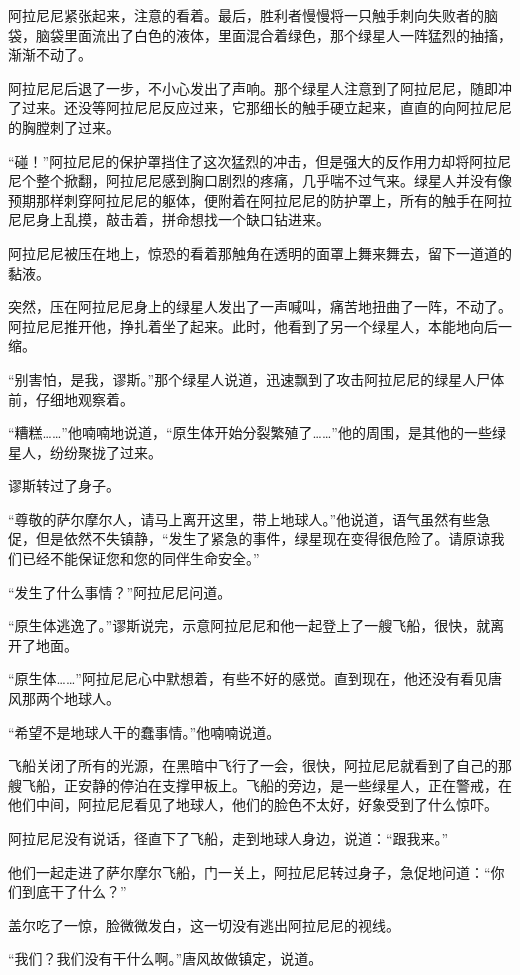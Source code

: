 阿拉尼尼紧张起来，注意的看着。最后，胜利者慢慢将一只触手刺向失败者的脑袋，脑袋里面流出了白色的液体，里面混合着绿色，那个绿星人一阵猛烈的抽搐，渐渐不动了。

阿拉尼尼后退了一步，不小心发出了声响。那个绿星人注意到了阿拉尼尼，随即冲了过来。还没等阿拉尼尼反应过来，它那细长的触手硬立起来，直直的向阿拉尼尼的胸膛刺了过来。

“碰！”阿拉尼尼的保护罩挡住了这次猛烈的冲击，但是强大的反作用力却将阿拉尼尼个整个掀翻，阿拉尼尼感到胸口剧烈的疼痛，几乎喘不过气来。绿星人并没有像预期那样刺穿阿拉尼尼的躯体，便附着在阿拉尼尼的防护罩上，所有的触手在阿拉尼尼身上乱摸，敲击着，拼命想找一个缺口钻进来。

阿拉尼尼被压在地上，惊恐的看着那触角在透明的面罩上舞来舞去，留下一道道的黏液。

突然，压在阿拉尼尼身上的绿星人发出了一声喊叫，痛苦地扭曲了一阵，不动了。阿拉尼尼推开他，挣扎着坐了起来。此时，他看到了另一个绿星人，本能地向后一缩。

“别害怕，是我，谬斯。”那个绿星人说道，迅速飘到了攻击阿拉尼尼的绿星人尸体前，仔细地观察着。

“糟糕……”他喃喃地说道，“原生体开始分裂繁殖了……”他的周围，是其他的一些绿星人，纷纷聚拢了过来。

谬斯转过了身子。

“尊敬的萨尔摩尔人，请马上离开这里，带上地球人。”他说道，语气虽然有些急促，但是依然不失镇静，“发生了紧急的事件，绿星现在变得很危险了。请原谅我们已经不能保证您和您的同伴生命安全。”

“发生了什么事情？”阿拉尼尼问道。

“原生体逃逸了。”谬斯说完，示意阿拉尼尼和他一起登上了一艘飞船，很快，就离开了地面。

“原生体……”阿拉尼尼心中默想着，有些不好的感觉。直到现在，他还没有看见唐风那两个地球人。

“希望不是地球人干的蠢事情。”他喃喃说道。

飞船关闭了所有的光源，在黑暗中飞行了一会，很快，阿拉尼尼就看到了自己的那艘飞船，正安静的停泊在支撑甲板上。飞船的旁边，是一些绿星人，正在警戒，在他们中间，阿拉尼尼看见了地球人，他们的脸色不太好，好象受到了什么惊吓。

阿拉尼尼没有说话，径直下了飞船，走到地球人身边，说道：“跟我来。”

他们一起走进了萨尔摩尔飞船，门一关上，阿拉尼尼转过身子，急促地问道：“你们到底干了什么？”

盖尔吃了一惊，脸微微发白，这一切没有逃出阿拉尼尼的视线。

“我们？我们没有干什么啊。”唐风故做镇定，说道。

